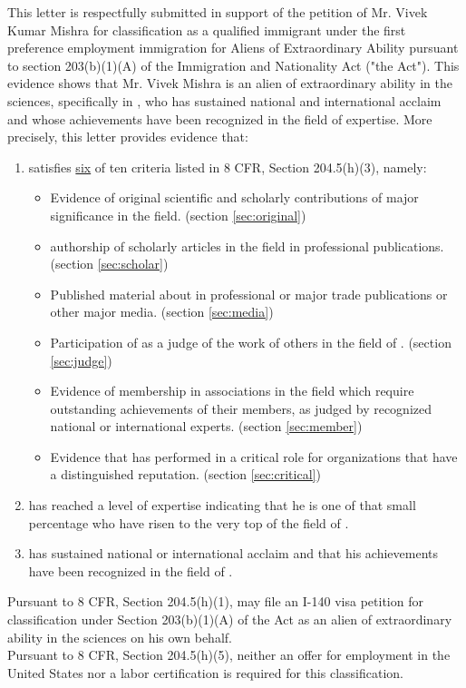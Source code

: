 This letter is respectfully submitted in support of the petition of Mr. Vivek Kumar Mishra for classification as a qualified immigrant under the first preference employment immigration for Aliens of Extraordinary Ability pursuant to section 203(b)(1)(A) of the Immigration and Nationality Act ("the Act"). This evidence shows that Mr. Vivek Mishra is an alien of extraordinary ability in the sciences, specifically in \underline{\fie{}}, who has sustained national and international acclaim and whose achievements have been recognized in the field of expertise. More precisely, this letter provides evidence that:
\begin{enumerate}
 \item \dr satisfies \underline{six} of ten criteria listed in 8 CFR, Section 204.5(h)(3), namely:
\begin{itemize}
 \item Evidence of \drs original scientific and scholarly contributions of major significance in the field. (section \ref{sec:original})
 \item \drs authorship of scholarly articles in the field in professional publications. (section \ref{sec:scholar})
 \item Published material about \dr in professional or major trade publications or other major media. (section \ref{sec:media})
 \item Participation of \dr as a judge of the work of others in the field of \fie{}. (section \ref{sec:judge})
 \item Evidence of \drs membership in associations in the field which require outstanding achievements of their members, as judged by recognized national or international experts. (section \ref{sec:member})
 \item Evidence that \dr has performed in a critical role for organizations that have a distinguished reputation. (section \ref{sec:critical})
\end{itemize}
 \item \dr has reached a level of expertise indicating that he is one of that small percentage who have risen to the very top of the field of \fie{}.
 \item \dr has sustained national or international acclaim and that his achievements have been recognized in the field of \fie{}.
\end{enumerate}


Pursuant to 8 CFR, Section 204.5(h)(1), \dr may file an I-140 visa petition for classification under Section 203(b)(1)(A) of the Act as an alien of extraordinary ability in the sciences on his own behalf.\\

Pursuant to 8 CFR, Section 204.5(h)(5), neither an offer for employment in the United States nor a labor certification is required for this classification.

